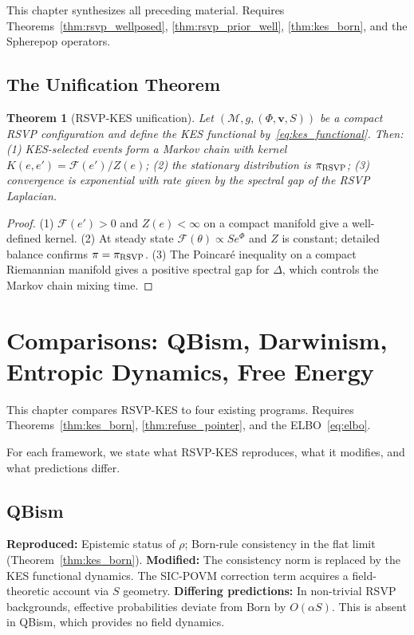 \documentclass[11pt, openright, twoside]{book}
\theoremstyle{plain}
\newtheorem{theorem}{Theorem}[chapter]
\theoremstyle{definition}
\theoremstyle{remark}
\newcommand{\vfield}{\mathbf{v}}
\newcommand{\Sfield}{S}
\newcommand{\rsvp}{(\Phi,\vfield,\Sfield)}
\begin{document}
\begin{depbox}
This chapter synthesizes all preceding material. Requires Theorems~\ref{thm:rsvp_wellposed},
\ref{thm:rsvp_prior_well}, \ref{thm:kes_born}, and the Spherepop operators.
\end{depbox}

\section{The Unification Theorem}

\begin{theorem}[RSVP-KES unification]
\label{thm:unification}
Let $(\mathcal{M},g,\rsvp)$ be a compact RSVP configuration and define the KES functional
by~\eqref{eq:kes_functional}. Then: (1) KES-selected events form a Markov chain with
kernel $K(e,e')=\mathcal{F}(e')/Z(e)$; (2) the stationary distribution is $\pi_{\rm RSVP}$;
(3) convergence is exponential with rate given by the spectral gap of the RSVP Laplacian.
\end{theorem}

\begin{proof}
(1) $\mathcal{F}(e')>0$ and $Z(e)<\infty$ on a compact manifold give a well-defined kernel.
(2) At steady state $\mathcal{F}(\theta)\propto\Sfield e^\Phi$ and $Z$ is constant; detailed
balance confirms $\pi=\pi_{\rm RSVP}$. (3) The Poincar\'{e} inequality on a compact
Riemannian manifold gives a positive spectral gap for $\Delta$, which controls the Markov
chain mixing time.
\end{proof}

\chapter{Comparisons: QBism, Darwinism, Entropic Dynamics, Free Energy}

\begin{depbox}
This chapter compares RSVP-KES to four existing programs. Requires Theorems~\ref{thm:kes_born},
\ref{thm:refuse_pointer}, and the ELBO~\eqref{eq:elbo}.
\end{depbox}

For each framework, we state what RSVP-KES reproduces, what it modifies, and what
predictions differ.

\section{QBism}

\textbf{Reproduced:} Epistemic status of $\rho$; Born-rule consistency in the flat limit
(Theorem~\ref{thm:kes_born}).
\textbf{Modified:} The consistency norm is replaced by the KES functional dynamics. The
SIC-POVM correction term acquires a field-theoretic account via $\Sfield$ geometry.
\textbf{Differing predictions:} In non-trivial RSVP backgrounds, effective probabilities
deviate from Born by $O(\alpha\Sfield)$. This is absent in QBism, which provides no
field dynamics.
\end{document}
